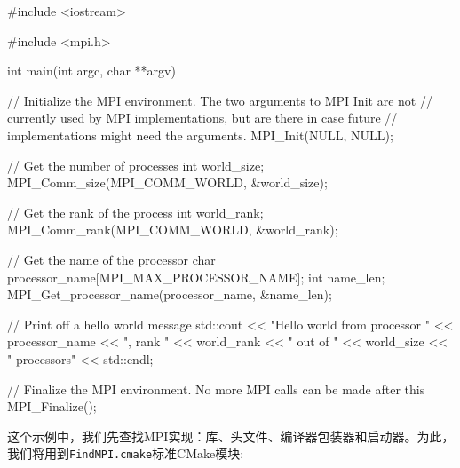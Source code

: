 \begin{codebox}[cpp]
#include <iostream>

#include <mpi.h>

int main(int argc, char **argv)
{
  // Initialize the MPI environment. The two arguments to MPI Init are not
  // currently used by MPI implementations, but are there in case future
  // implementations might need the arguments.
  MPI_Init(NULL, NULL);

  // Get the number of processes
  int world_size;
  MPI_Comm_size(MPI_COMM_WORLD, &world_size);

  // Get the rank of the process
  int world_rank;
  MPI_Comm_rank(MPI_COMM_WORLD, &world_rank);

  // Get the name of the processor
  char processor_name[MPI_MAX_PROCESSOR_NAME];
  int name_len;
  MPI_Get_processor_name(processor_name, &name_len);

  // Print off a hello world message
  std::cout << "Hello world from processor " << processor_name << ", rank "
            << world_rank << " out of " << world_size << " processors" << std::endl;
            
  // Finalize the MPI environment. No more MPI calls can be made after this
  MPI_Finalize();
}
\end{codebox}


这个示例中，我们先查找MPI实现：库、头文件、编译器包装器和启动器。为此，我们将用到\texttt{FindMPI.cmake}标准CMake模块:

